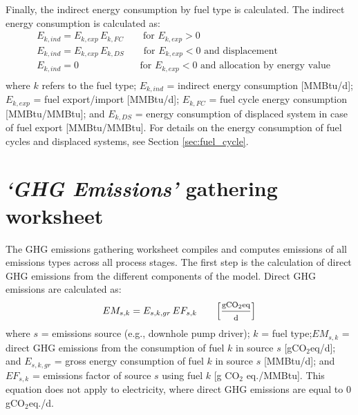 \documentclass[11pt]{report}
\newcommand{\marg}[1]{{\footnotesize\textit{\textcolor{stanford}{'#1'}}}}
\newcommand{\marginnote}[1]{\marginpar{\marg{#1}}}
\newcommand{\sheet}[1]{\textit{`{#1}'}}
\begin{document}
Finally, \marginnote{Energy \\ Consumption \\ Table 4} the indirect energy consumption by fuel type is calculated. The indirect energy consumption is calculated as:
\begin{equation}
\begin{split}
& E_{k,ind} = E_{k,exp} \, E_{k,FC} \quad\quad \text{for}\,\, E_{k,exp} > 0\\
& E_{k,ind} = E_{k,exp} \, E_{k,DS} \quad\quad \text{for}\,\, E_{k,exp} < 0 \,\,\text{and displacement}\\
& E_{k,ind} = 0 \quad\quad\quad\quad\quad\quad\,\, \text{for}\,\, E_{k,exp} < 0 \,\,\text{and allocation by energy value}\\
\end{split}
\end{equation}
where $k$ refers to the fuel type; $E_{k,ind}$ = indirect energy consumption [MMBtu/d]; $E_{k,exp}$ = fuel export/import [MMBtu/d]; $E_{k,FC}$ = fuel cycle energy consumption [MMBtu/MMBtu]; and $E_{k,DS}$ = energy consumption of displaced system in case of fuel export [MMBtu/MMBtu]. For details on the energy consumption of fuel cycles and displaced systems, see Section \ref{sec:fuel_cycle}.


\clearpage

\section{\sheet{GHG Emissions} gathering worksheet}\label{sec:GHG_emissions}

The GHG emissions gathering worksheet compiles and computes emissions of all emissions types across all process stages. The first step \marginnote{GHG \\ Emissions Table 1}is the calculation of direct GHG emissions from the different components of the model. Direct GHG emissions are calculated as: 
\begin{equation}
EM_{s,k} = E_{s,k,gr} \, EF_{s,k} \quad\quad\footnotesize{\left[\frac{\text{gCO$_{2}$eq}}{\text{d}}\right]} \label{direct_emissions}
\end{equation}
where $s$ = emissions source (e.g., downhole pump driver); $k$ = fuel type;\newline $EM_{s,k}$ = direct GHG emissions from the consumption of fuel $k$ in source $s$ [gCO$_{2}$eq/d]; and $E_{s,k,gr}$ = gross energy consumption of fuel $k$ in source $s$ [MMBtu/d]; and $EF_{s,k}$ = emissions factor of source $s$ using fuel $k$ [g CO$_2$ eq./MMBtu]. This equation does not apply to electricity, where direct GHG emissions are equal to 0 gCO$_{2}$eq./d.
\end{document}
